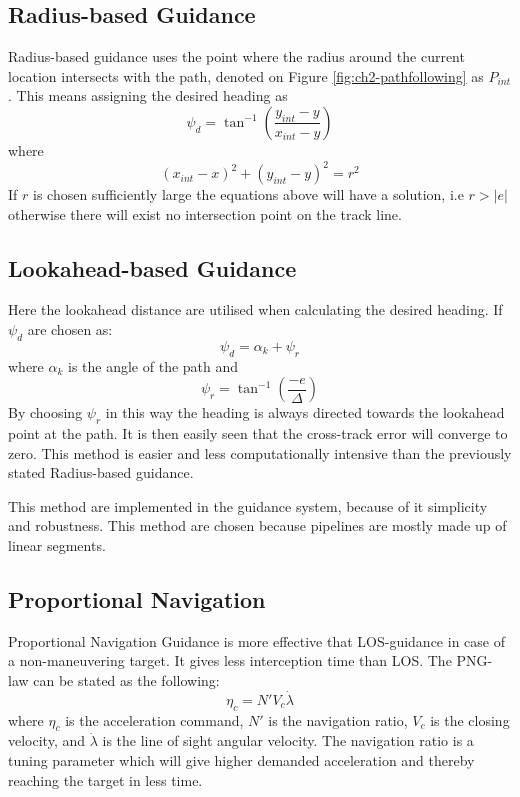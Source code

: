 	\subsection{Radius-based Guidance}
		Radius-based guidance uses the point where the radius around the current location intersects
		with the path, denoted on Figure \ref{fig:ch2-pathfollowing} as $P_{int}$. This
		means assigning the desired heading as 
		\begin{equation}
			\psi_d = \tan^{-1}(\frac{y_{int} - y}{x_{int} - y})
		\end{equation}
		where 
		\begin{equation}
			(x_{int} - x)^2 + (y_{int} - y)^2 = r^2
		\end{equation}
		If $r$ is chosen sufficiently large the equations above will have a solution, i.e $r > |e|$
		otherwise there will exist no intersection point on the track line.
		\cite{guidance_planar_path}
	
	\subsection{Lookahead-based Guidance}
		Here the lookahead distance are utilised when calculating the desired heading. If $\psi_d$ are
		chosen as:
		\begin{equation}
			\psi_d = \alpha_k + \psi_r
		\end{equation}
		where $\alpha_k$ is the angle of the path and
		\begin{equation}
			\psi_r = \tan^{-1} (\frac{-e}{\Delta})
		\end{equation}
		By choosing $\psi_r$ in this way the heading is always directed towards the lookahead point at
		the path. It is then easily seen that the cross-track error will converge to zero. This
		method is easier and less computationally intensive than the previously stated Radius-based
		guidance. \cite{guidance_planar_path}

		This method are implemented in the guidance system, because of it simplicity and robustness.
		This method are chosen because pipelines are mostly made up of linear segments. 

	
	\subsection{Proportional Navigation}
		Proportional Navigation Guidance is more effective that LOS-guidance in case of a
		non-maneuvering
		target. It gives less interception time than LOS. The PNG-law can be stated as the following:
		\cite{GuidanceReview}
		\begin{equation}
			\eta_c = N' V_c \dot{\lambda}
		\end{equation}
		where $\eta_c$ is the acceleration command, $N'$ is the navigation ratio, $V_c$ is the closing
		velocity, and $\dot{\lambda}$ is the line of sight angular velocity. The navigation ratio is a
		tuning
		parameter which will give higher demanded acceleration and thereby reaching the target in less
		time.

